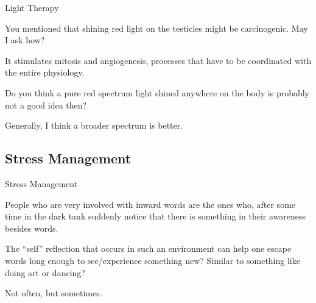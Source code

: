 \documentclass[11pt,oneside,openany,extrafontsizes]{memoir}
\begin{document}
\begin{emailexchange}{Light Therapy}

    \begin{question}
        You mentioned that shining red light on the testicles might be carcinogenic. May I ask how?
    \end{question}

    \begin{answer}
       It stimulates mitosis and angiogenesis, processes that have to be coordinated with the entire physiology.
    \end{answer}

    \begin{question}
        Do you think a pure red spectrum light shined anywhere on the body is probably not a good idea then?
    \end{question}

    \begin{answer}
      Generally, I think a broader spectrum is better.
    \end{answer}
\end{emailexchange}

\subsection{Stress Management}

\begin{emailexchange}{Stress Management}

    \begin{answer}
        People who are very involved with inward words are the ones who, after some time in the dark tank suddenly notice that there is something in their awareness besides words.
    \end{answer}

    \begin{question}
        The \enquote{self} reflection that occurs in such an environment can help one escape words long enough to see/experience something new? Similar to something like doing art or dancing?
    \end{question}

    \begin{answer}
        Not often, but sometimes.
    \end{answer}
\end{emailexchange}
\end{document}
